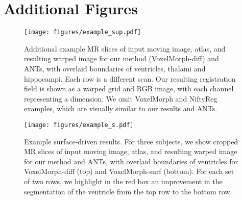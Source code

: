 \documentclass{article}
\begin{document}
\clearpage
\twocolumn

\section*{Additional Figures}





\begin{figure}[h!]
\begin{center}
		\texttt{[image: figures/example\_sup.pdf]}
	\end{center}
	\caption{Additional example MR slices of input moving image, atlas, and resulting warped image for our method (VoxelMorph-diff) and ANTs, with overlaid boundaries of ventricles, thalami and hippocampi. Each row is a different scan. Our resulting registration field is shown as a warped grid and RGB image, with each channel representing a dimension. We omit VoxelMorph and NiftyReg examples, which are visually similar to our results and ANTs. 
	}
	\label{fig:sup:reg_examples}
\end{figure}

\newpage

\begin{figure}[h!]
	\vspace{1.1cm}
	\begin{center}
		\texttt{[image: figures/example\_s.pdf]}
	\end{center}
	\caption{Example surface-driven results. For three subjects, we show cropped MR slices of input moving image, atlas, and resulting warped image for our method and ANTs, with overlaid boundaries of ventricles for VoxelMorph-diff (top) and VoxelMorph-surf (bottom). For each set of two rows, we highlight in the red box an improvement in the segmentation of the ventricle from the top row to the bottom row.
	}
	\label{fig:sup:reg_examples_supervised}
\end{figure}

















 
\end{document}
